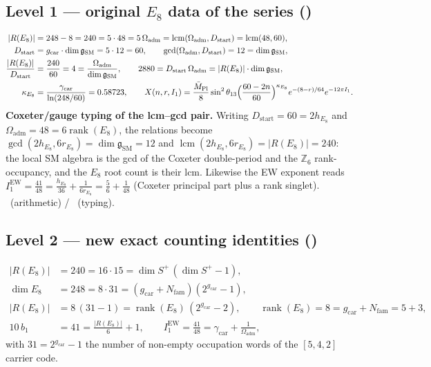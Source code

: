 \documentclass[11pt,a4paper]{article}
\newcommand{\Mbar}{\bar M_{\mathrm{Pl}}}
\newcommand{\gcar}{g_{\mathrm{car}}}
\newcommand{\Nfam}{N_{\mathrm{fam}}}
\newcommand{\Oadm}{\Omega_{\mathrm{adm}}}
\newcommand{\dimg}{\dim\mathfrak g_{\mathrm{SM}}}
\newcommand{\Dstart}{D_{\mathrm{start}}}
\newcommand{\kappaE}{\kappa_{E_8}}
\theoremstyle{definition}
\begin{document}
\subsection{Level 1 --- original $E_8$ data of the series (\mE)}
\begin{align}
  |R(E_8)| &= 248-8=240=5\cdot48=5\,\Oadm=\operatorname{lcm}(\Oadm,\Dstart)=\operatorname{lcm}(48,60), \\
  \Dstart &= \gcar\cdot\dimg=5\cdot12=60,\qquad \gcd(\Oadm,\Dstart)=12=\dimg, \\
  \frac{|R(E_8)|}{\Dstart} &= \frac{240}{60}=4=\frac{\Oadm}{\dimg},\qquad
  2880=\Dstart\,\Oadm=|R(E_8)|\cdot\dimg, \\
  \kappaE &= \frac{\gamma_{\mathrm{car}}}{\ln(248/60)}=0.58723,\qquad
  X(n,r,I_1)=\frac{\Mbar}{8}\sin^2\theta_{13}\Bigl(\frac{60-2n}{60}\Bigr)^{\kappaE}e^{-(8-r)/64}e^{-12\pi I_1}.
\end{align}
\textbf{Coxeter/gauge typing of the lcm--gcd pair.} Writing $\Dstart=60=2h_{E_8}$ and
$\Oadm=48=6\operatorname{rank}(E_8)$, the relations become
$\gcd(2h_{E_8},6r_{E_8})=\dimg=12$ and $\operatorname{lcm}(2h_{E_8},6r_{E_8})=|R(E_8)|=240$: the local
SM algebra is the gcd of the Coxeter double-period and the $\mathbb Z_6$ rank-occupancy, and the $E_8$
root count is their lcm. Likewise the EW exponent reads
$I_1^{\mathrm{EW}}=\tfrac{41}{48}=\tfrac{h_{E_8}}{36}+\tfrac{1}{6r_{E_8}}=\tfrac56+\tfrac{1}{48}$
(Coxeter principal part plus a rank singlet). \mE\ (arithmetic) / \mC\ (typing).

\subsection{Level 2 --- new exact counting identities (\mE)}
\begin{align}
  |R(E_8)| &= 240 = 16\cdot15=\dim S^+\,(\dim S^+-1), \\
  \dim E_8 &= 248 = 8\cdot31=(\gcar+\Nfam)(2^{\gcar}-1), \\
  |R(E_8)| &= 8\,(31-1)=\operatorname{rank}(E_8)\,(2^{\gcar}-2),\qquad \operatorname{rank}(E_8)=8=\gcar+\Nfam=5+3, \\
  10\,b_1 &= 41 = \frac{|R(E_8)|}{6}+1,\qquad I_1^{\mathrm{EW}}=\frac{41}{48}=\gamma_{\mathrm{car}}+\frac{1}{\Oadm},
\end{align}
with $31=2^{\gcar}-1$ the number of non-empty occupation words of the $[5,4,2]$ carrier code.
\end{document}
